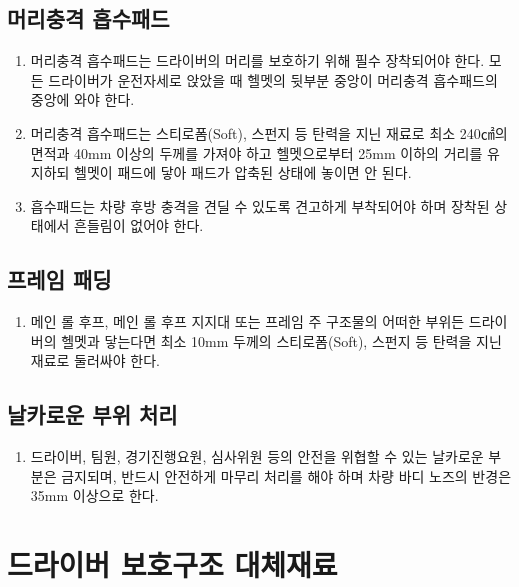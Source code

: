 \documentclass[final,a4paper,10pt]{report}
\begin{document}
\section{머리충격 흡수패드}\label{rule:formula-technical.head-restraint}
\begin{enumerate}
  \item\label{rule:formula-technical.head-restraint.centered-behind-helmet} 머리충격 흡수패드는 드라이버의 머리를 보호하기 위해 필수 장착되어야 한다. 모든 드라이버가 운전자세로 앉았을 때 헬멧의 뒷부분 중앙이 머리충격 흡수패드의 중앙에 와야 한다.
  \item\label{rule:formula-technical.head-restraint.material-size-and-clearance} 머리충격 흡수패드는 스티로폼(Soft), 스펀지 등 탄력을 지닌 재료로 최소 240㎠의 면적과 40mm 이상의 두께를 가져야 하고 헬멧으로부터 25mm 이하의 거리를 유지하되 헬멧이 패드에 닿아 패드가 압축된 상태에 놓이면 안 된다.
  \item\label{rule:formula-technical.head-restraint.secure-mounting} 흡수패드는 차량 후방 충격을 견딜 수 있도록 견고하게 부착되어야 하며 장착된 상태에서 흔들림이 없어야 한다.
\end{enumerate}

\section{프레임 패딩}\label{rule:formula-technical.frame-padding}
\begin{enumerate}
  \item\label{rule:formula-technical.frame-padding.helmet-contact-padding-10mm} 메인 롤 후프, 메인 롤 후프 지지대 또는 프레임 주 구조물의 어떠한 부위든 드라이버의 헬멧과 닿는다면 최소 10mm 두께의 스티로폼(Soft), 스펀지 등 탄력을 지닌 재료로 둘러싸야 한다.
\end{enumerate}

\section{날카로운 부위 처리}\label{rule:formula-technical.sharp-edges}
\begin{enumerate}
  \item\label{rule:formula-technical.sharp-edges.min-nose-radius-35mm} 드라이버, 팀원, 경기진행요원, 심사위원 등의 안전을 위협할 수 있는 날카로운 부분은 금지되며, 반드시 안전하게 마무리 처리를 해야 하며 차량 바디 노즈의 반경은 35mm 이상으로 한다.
\end{enumerate}

\chapter{드라이버 보호구조 대체재료} \label{chapter:드라이버 보호구조 대체재료}
\end{document}
